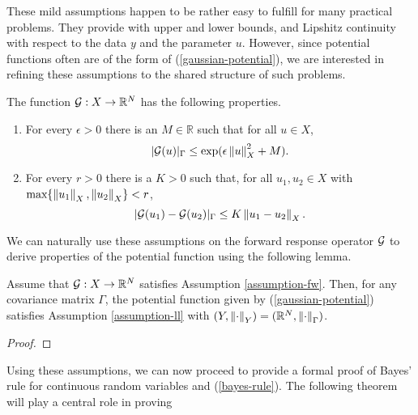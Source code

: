 These mild assumptions happen to be rather easy to fulfill for many practical problems. They provide with upper and lower bounds, and Lipshitz continuity with respect to the data $y$ and the parameter $u$.  However, since potential functions often are of the form of (\ref{gaussian-potential}), we are interested in refining these assumptions to the shared structure of such problems.

\begin{assumption}\label{assumption-fw}
  The function $\mathcal{G} : X \rightarrow \mathbb{R}^N$ has the following properties.

  \begin{enumerate}
  \item For every $\epsilon > 0$ there is an $M \in \mathbb{R}$ such that for all $u \in X$,
    \begin{equation*}
      |\mathcal{G}(u)|_\Gamma \le \exp(\epsilon \left\lVert u\right\rVert_X^2 + M).
    \end{equation*}
  \item For every $r > 0$ there is a $K > 0$ such that, for all $u_1, u_2 \in X$ with $\text{max}\{\left\lVert u_1\right\rVert_X, \left\lVert u_2\right\rVert_X\} < r$,
    \begin{equation*}
      |\mathcal{G}(u_1) - \mathcal{G}(u_2)|_\Gamma \le K\left\lVert u_1 - u_2\right\rVert_X.
    \end{equation*}
  \end{enumerate}
\end{assumption}

We can naturally use these assumptions on the forward response operator $\mathcal{G}$ to derive properties of the potential function using the following lemma.

\begin{lemma} \label{fw-implies-ll}
  Assume that $\mathcal{G}  : X \rightarrow \mathbb{R}^N$ satisfies Assumption \ref{assumption-fw}. Then, for any covariance matrix $\Gamma$, the potential function given by (\ref{gaussian-potential}) satisfies Assumption \ref{assumption-ll} with $(Y, \left\lVert\cdot\right\rVert_Y) = (\mathbb{R}^N, \left\lVert\cdot\right\rVert_\Gamma)$.
\end{lemma}

\begin{proof} 
\end{proof}

Using these assumptions, we can now proceed to provide a formal proof of Bayes' rule for continuous random variables and (\ref{bayes-rule}). The following theorem will play a central role in proving

